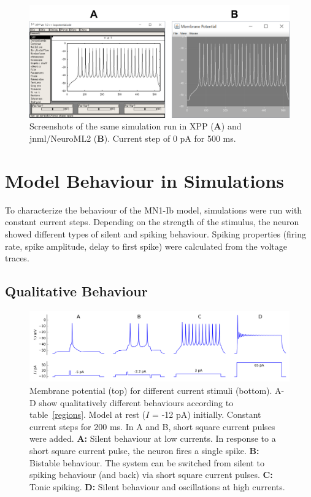 \documentclass[12pt,a4paper,]{report}
\begin{document}
\begin{figure}
\centering
\includegraphics[]{images/xpp-neuroml2.png}
\caption[Screenshots of the same simulation run in XPP and jnml/NeuroML2]{Screenshots of the same simulation run in XPP (\textbf{A})
and jnml/NeuroML2 (\textbf{B}). Current step of 0 pA for 500
ms.}\label{xpp-neuroml2}
\end{figure}

\section{Model Behaviour in
Simulations}\label{model-behaviour-in-simulations}

To characterize the behaviour of the MN1-Ib model, simulations were run
with constant current steps. Depending on the strength of the stimulus,
the neuron showed different types of silent and spiking behaviour.
Spiking properties (firing rate, spike amplitude, delay to first spike)
were calculated from the voltage traces.

\subsection{Qualitative Behaviour}\label{qualitative-behaviour}

\begin{figure}
\centering
\includegraphics[]{images/voltage_traces.png}
\caption[Membrane potential for different current stimuli
]{Membrane potential (top) for different current stimuli
(bottom). A-D show qualitatively different behaviours according to
table~\ref{regions}. Model at rest ($I$ = -12 pA) initially. Constant
current steps for 200 ms. In A and B, short square current pulses were
added. \textbf{A:} Silent behaviour at low currents. In response to a
short square current pulse, the neuron fires a single spike. \textbf{B:}
Bistable behaviour. The system can be switched from silent to spiking
behaviour (and back) via short square current pulses. \textbf{C:} Tonic
spiking. \textbf{D:} Silent behaviour and oscillations at high
currents.}\label{voltage-traces}
\end{figure}
\end{document}
